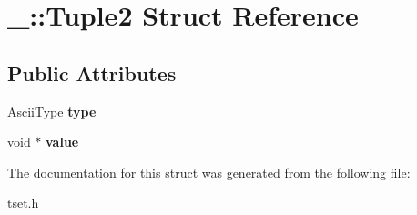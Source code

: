 \hypertarget{struct___1_1_tuple2}{}\section{\+\_\+\+:\+:Tuple2 Struct Reference}
\label{struct___1_1_tuple2}
\subsection*{Public Attributes}
\begin{DoxyCompactItemize}
\item 
\mbox{\label{struct___1_1_tuple2_a7707d0df48932fa6f6170c450561a871}} 
Ascii\+Type {\bfseries type}
\item 
\mbox{\label{struct___1_1_tuple2_a80d9ce7ee73d43fc5b6b6392f3ec54ca}} 
void $\ast$ {\bfseries value}
\end{DoxyCompactItemize}


The documentation for this struct was generated from the following file\+:\begin{DoxyCompactItemize}
\item 
tset.\+h\end{DoxyCompactItemize}

